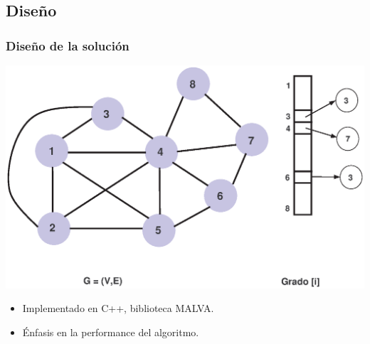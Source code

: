 
\subsection{Diseño}
\begin{frame}\frametitle{Diseño de la solución}
\begin{center}
        \includegraphics[scale=0.35]{figuras/Solucion/chap5_fig1}
\end{center}
\begin{itemize}
 \item Implementado en C++, biblioteca MALVA.
 \item Énfasis en la performance del algoritmo.
\end{itemize} 
\end{frame}

